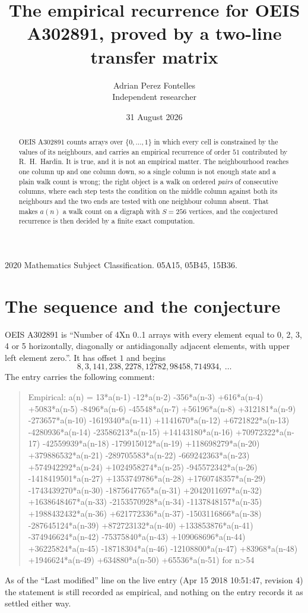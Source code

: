 \documentclass[11pt,a4paper]{article}
\title{The empirical recurrence for OEIS A302891, proved by a two-line transfer matrix}
\author{Adrian Perez Fontelles\\ \small Independent researcher}
\date{31 August 2026}
\theoremstyle{plain}
\theoremstyle{definition}
\begin{document}
\maketitle

\begin{abstract}
OEIS A302891 counts arrays over $\{0,\dots,1\}$ in which every cell is constrained by the
values of its neighbours, and carries an empirical recurrence of order $51$ contributed
by R.~H.~Hardin. It is true, and it is not an empirical matter. The neighbourhood reaches one
column up and one column down, so a single column is not enough state and a plain walk count
is wrong; the right object is a walk on ordered \emph{pairs} of consecutive columns, where
each step tests the condition on the middle column against both its neighbours and the two
ends are tested with one neighbour column absent. That makes $a(n)$ a walk count on a digraph
with $S=256$ vertices, and the conjectured recurrence is then decided by a finite exact
computation.
\end{abstract}

\noindent\small 2020 Mathematics Subject Classification. 05A15, 05B45, 15B36.\normalsize

\section{The sequence and the conjecture}

OEIS A302891 is ``Number of 4Xn 0..1 arrays with every element equal to 0, 2, 3, 4 or 5 horizontally, diagonally or antidiagonally adjacent elements, with upper left element zero.''. It has offset $1$ and begins
\[
8, 3, 141, 238, 2278, 12782, 98458, 714934,\ \dots
\]
The entry carries the following comment:
\begin{quote}\small
Empirical: a(n) = 13*a(n-1) -12*a(n-2) -356*a(n-3) +616*a(n-4) +5083*a(n-5) -8496*a(n-6) -45548*a(n-7) +56196*a(n-8) +312181*a(n-9) -273657*a(n-10) -1619340*a(n-11) +1141670*a(n-12) +6721822*a(n-13) -4280936*a(n-14) -23586213*a(n-15) +14143180*a(n-16) +70972322*a(n-17) -42559939*a(n-18) -179915012*a(n-19) +118698279*a(n-20) +379886532*a(n-21) -289705583*a(n-22) -669242363*a(n-23) +574942292*a(n-24) +1024958274*a(n-25) -945572342*a(n-26) -1418419501*a(n-27) +1353749786*a(n-28) +1760748357*a(n-29) -1743439270*a(n-30) -1875647765*a(n-31) +2042011697*a(n-32) +1638648467*a(n-33) -2153570928*a(n-34) -1137848157*a(n-35) +1988432432*a(n-36) +621772336*a(n-37) -1503116866*a(n-38) -287645124*a(n-39) +872723132*a(n-40) +133853876*a(n-41) -374946624*a(n-42) -75375840*a(n-43) +109068696*a(n-44) +36225824*a(n-45) -18718304*a(n-46) -12108800*a(n-47) +83968*a(n-48) +1946624*a(n-49) +634880*a(n-50) +65536*a(n-51) for n>54
\end{quote}
As of the ``Last modified'' line on the live entry (Apr 15 2018 10:51:47, revision 4) the statement is
still recorded as empirical, and nothing on the entry records it as settled either way.
\end{document}
